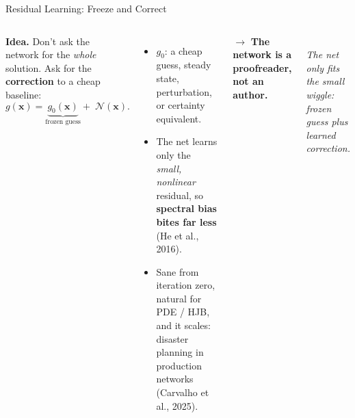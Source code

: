 \documentclass[aspectratio=169,11pt]{beamer}
\newcommand{\x}{\bm{x}}
\newcommand{\lemph}[1]{{\color{uzhblue}\bfseries #1}}
\newcommand{\visualcaption}[1]{{\scriptsize\color{stone}\itshape #1}}
\begin{document}
\begin{frame}[shrink=10]{Residual Learning: Freeze and Correct}
\begin{columns}[T,onlytextwidth]
\textbf{Idea.} Don't ask the network for the \emph{whole} solution. Ask for the \lemph{correction} to a cheap baseline:
\[
  g(\x)=\underbrace{g_0(\x)}_{\text{frozen guess}}
   +\;\mathcal{N}(\x).
\]
\begin{itemize}\setlength\itemsep{2pt}\footnotesize
  \item $g_0$: a cheap guess, steady state, perturbation, or certainty equivalent.
  \item The net learns only the \emph{small, nonlinear} residual, so \lemph{spectral bias bites far less} (He et al., 2016).
  \item Sane from iteration zero, natural for PDE / HJB, and it scales: disaster planning in production networks (Carvalho et al., 2025).
\end{itemize}
\vspace{0.3em}
{\footnotesize $\rightarrow$ \lemph{The network is a proofreader, not an author.}}
\centering
{}\\[2pt]
\visualcaption{The net only fits the small wiggle: frozen guess plus learned correction.}
\end{columns}
\end{frame}
\end{document}

